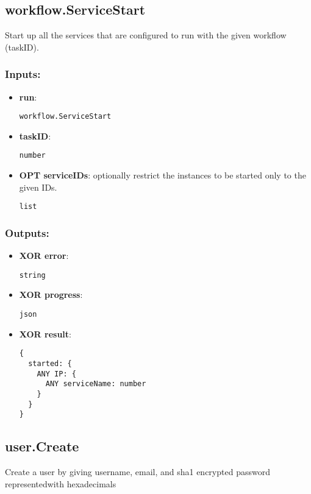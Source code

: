\subsection{workflow.ServiceStart}
\label{ch:builtinservices:workflow.ServiceStart}
Start up all the services that are configured to run with the given workflow (taskID).
\subsubsection*{Inputs:}
\begin{itemize}
    \item \textbf{run}: 
\begin{lstlisting}
workflow.ServiceStart
\end{lstlisting}
    \item \textbf{taskID}: 
\begin{lstlisting}
number
\end{lstlisting}
    \item \textbf{OPT serviceIDs}: optionally restrict the instances to be started only to the given IDs.
\begin{lstlisting}
list
\end{lstlisting}
  \end{itemize}

\subsubsection*{Outputs:}
\begin{itemize}
    \item \textbf{XOR error}: 
\begin{lstlisting}
string
\end{lstlisting}
    \item \textbf{XOR progress}: 
\begin{lstlisting}
json
\end{lstlisting}
    \item \textbf{XOR result}: 
\begin{lstlisting}
{
  started: {
    ANY IP: {
      ANY serviceName: number
    }
  }
}
\end{lstlisting}
  \end{itemize}

\subsection{user.Create}
\label{ch:builtinservices:user.Create}
Create a user by giving username, email, and sha1 encrypted password representedwith hexadecimals
